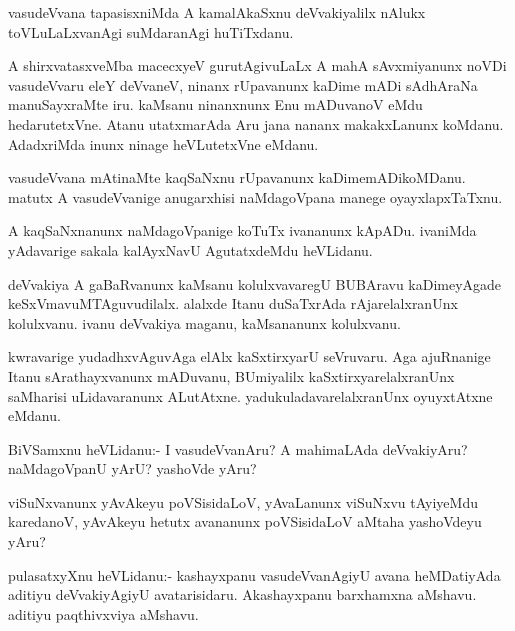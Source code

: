 \documentclass{article}
\begin{document}
\begin{mn}
vasudeVvana tapasisxniMda A kamalAkaSxnu deVvakiyalilx nAlukx
toVLuLaLxvanAgi suMdaranAgi huTiTxdanu.
\end{mn}

\begin{mn}%
A shirxvatasxveMba macecxyeV gurutAgivuLaLx A mahA sAvxmiyanunx noVDi
vasudeVvaru eleY deVvaneV, ninanx rUpavanunx kaDime mADi sAdhAraNa
manuSayxraMte iru. kaMsanu ninanxnunx Enu mADuvanoV eMdu
hedarutetxVne. Atanu utatxmarAda Aru jana nananx makakxLanunx
koMdanu. AdadxriMda inunx ninage heVLutetxVne eMdanu.
\end{mn}

\begin{mn}
vasudeVvana mAtinaMte kaqSaNxnu rUpavanunx kaDimemADikoMDanu. matutx A
vasudeVvanige anugarxhisi naMdagoVpana manege oyayxlapxTaTxnu.
\end{mn}

\begin{mn}%
A kaqSaNxnanunx naMdagoVpanige koTuTx ivananunx kApADu. ivaniMda
yAdavarige sakala kalAyxNavU AgutatxdeMdu heVLidanu.
\end{mn}

\begin{mn}
deVvakiya A gaBaRvanunx kaMsanu kolulxvavaregU BUBAravu kaDimeyAgade
keSxVmavuMTAguvudilalx. alalxde Itanu duSaTxrAda rAjarelalxranUnx
kolulxvanu. ivanu deVvakiya maganu, kaMsananunx kolulxvanu.
\end{mn}

\begin{mn}%
kwravarige yudadhxvAguvAga elAlx kaSxtirxyarU seVruvaru. Aga
ajuRnanige Itanu sArathayxvanunx mADuvanu, BUmiyalilx
kaSxtirxyarelalxranUnx saMharisi uLidavaranunx
ALutAtxne. yadukuladavarelalxranUnx oyuyxtAtxne eMdanu.
\end{mn}

\begin{mn}
BiVSamxnu heVLidanu:- I vasudeVvanAru? A mahimaLAda deVvakiyAru?
naMdagoVpanU yArU? yashoVde yAru?
\end{mn}

\begin{mn}
viSuNxvanunx yAvAkeyu poVSisidaLoV, yAvaLanunx viSuNxvu tAyiyeMdu
karedanoV, yAvAkeyu hetutx avananunx poVSisidaLoV aMtaha yashoVdeyu yAru?
\end{mn}

\begin{mn}%
pulasatxyXnu heVLidanu:- kashayxpanu vasudeVvanAgiyU avana heMDatiyAda
aditiyu deVvakiyAgiyU avatarisidaru. Akashayxpanu barxhamxna
aMshavu. aditiyu paqthivxviya aMshavu.
\end{mn}
\end{document}
